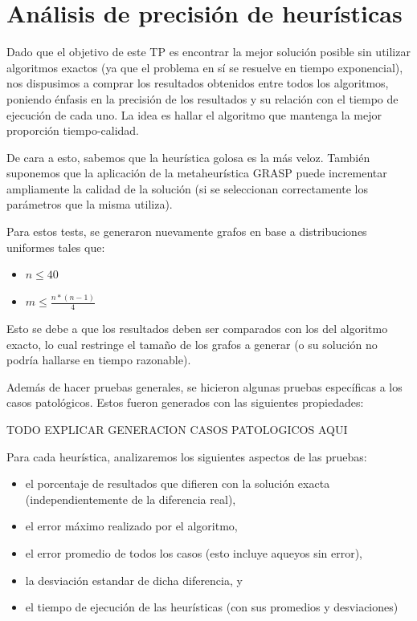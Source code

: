 \section{Análisis de precisión de heurísticas}

Dado que el objetivo de este TP es encontrar la mejor solución posible sin utilizar algoritmos exactos (ya que el problema en sí se resuelve en tiempo exponencial), nos dispusimos a comprar los resultados obtenidos entre todos los algoritmos, poniendo énfasis en la precisión de los resultados y su relación con el tiempo de ejecución de cada uno. La idea es hallar el algoritmo que mantenga la mejor proporción tiempo-calidad.

De cara a esto, sabemos que la heurística golosa es la más veloz. También suponemos que la aplicación de la metaheurística GRASP puede incrementar ampliamente la calidad de la solución (si se seleccionan correctamente los parámetros que la misma utiliza).

Para estos tests, se generaron nuevamente grafos en base a distribuciones uniformes tales que:

\begin{itemize}
	\item $n \leq 40$
	\item $m \leq \frac{n * (n-1)}{4}$
\end{itemize}

Esto se debe a que los resultados deben ser comparados con los del algoritmo exacto, lo cual restringe el tamaño de los grafos a generar (o su solución no podría hallarse en tiempo razonable).

Además de hacer pruebas generales, se hicieron algunas pruebas específicas a los casos patológicos. Estos fueron generados con las siguientes propiedades:

TODO EXPLICAR GENERACION CASOS PATOLOGICOS AQUI

Para cada heurística, analizaremos los siguientes aspectos de las pruebas:

\begin{itemize}
	\item el porcentaje de resultados que difieren con la solución exacta (independientemente de la diferencia real),
	\item el error máximo realizado por el algoritmo,
	\item el error promedio de todos los casos (esto incluye aqueyos sin error),
	\item la desviación estandar de dicha diferencia, y
    \item el tiempo de ejecución de las heurísticas (con sus promedios y desviaciones)
\end{itemize}

